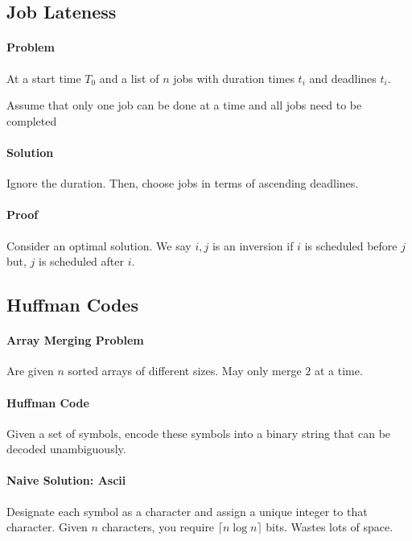 


\subsection{Job Lateness}
\paragraph{Problem}
At a start time \(T_0\) and a list of \(n\) jobs with duration times
\(t_i\) and deadlines \(t_i\).

Assume that only one job can be done at a time and all jobs need to
be completed

\paragraph{Solution}
Ignore the duration. Then, choose jobs in terms of ascending deadlines.

\paragraph{Proof}
Consider an optimal solution.
We say \(i, j\) is an inversion if \(i\) is scheduled before
\(j\) but, \(j\) is scheduled after \(i\).

\subsection{Huffman Codes}
\paragraph{Array Merging Problem}
Are given \(n\) sorted arrays of different
sizes. May only merge \(2\) at a time.

\paragraph{Huffman Code}
Given a set of symbols, encode these symbols into a binary string
that can be decoded unambiguously.

\paragraph{Naive Solution: Ascii}
Designate each symbol as a character and assign a unique integer
to that character. Given \(n\) characters, you require
\(\lceil n \log n \rceil\)
bits.
Wastes lots of space.

